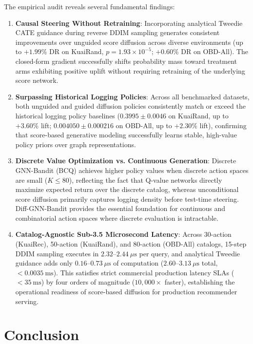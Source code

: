 \documentclass[preprint,12pt,3p]{elsarticle}
\begin{document}
The empirical audit reveals several fundamental findings:
\begin{enumerate}
    \item \textbf{Causal Steering Without Retraining}: Incorporating analytical Tweedie CATE guidance during reverse DDIM sampling generates consistent improvements over unguided score diffusion across diverse environments (up to $+1.99\%$ DR on KuaiRand, $p = 1.93 \times 10^{-5}$; $+0.60\%$ DR on OBD-All). The closed-form gradient successfully shifts probability mass toward treatment arms exhibiting positive uplift without requiring retraining of the underlying score network.
    \item \textbf{Surpassing Historical Logging Policies}: Across all benchmarked datasets, both unguided and guided diffusion policies consistently match or exceed the historical logging policy baselines ($0.3995 \pm 0.0046$ on KuaiRand, up to $+3.60\%$ lift; $0.004050 \pm 0.000216$ on OBD-All, up to $+2.30\%$ lift), confirming that score-based generative modeling successfully learns stable, high-value policy priors over graph representations.
    \item \textbf{Discrete Value Optimization vs. Continuous Generation}: Discrete GNN-Bandit (BCQ) achieves higher policy values when discrete action spaces are small ($K \le 80$), reflecting the fact that Q-value networks directly maximize expected return over the discrete catalog, whereas unconditional score diffusion primarily captures logging density before test-time steering. Diff-GNN-Bandit provides the essential foundation for continuous and combinatorial action spaces where discrete evaluation is intractable.
    \item \textbf{Catalog-Agnostic Sub-3.5 Microsecond Latency}: Across 30-action (KuaiRec), 50-action (KuaiRand), and 80-action (OBD-All) catalogs, 15-step DDIM sampling executes in $2.32$--$2.44 \ \mu\text{s}$ per query, and analytical Tweedie guidance adds only $0.16$--$0.73 \ \mu\text{s}$ of computation ($2.60$--$3.13 \ \mu\text{s}$ total, $< 0.0035 \ \text{ms}$). This satisfies strict commercial production latency SLAs ($< 35 \ \text{ms}$) by four orders of magnitude ($10,000\times$ faster), establishing the operational readiness of score-based diffusion for production recommender serving.
\end{enumerate}

\section{Conclusion}
\label{sec:conclusion}
\end{document}
